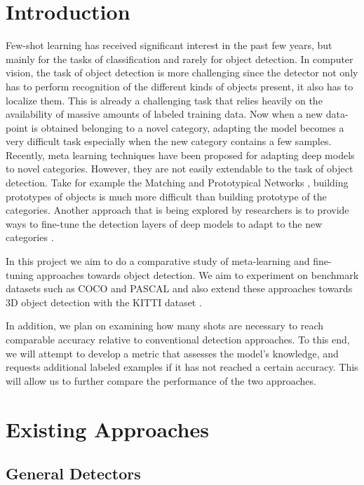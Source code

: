 \documentclass{article}
\begin{document}
\section{Introduction}
{\color{magenta}
Few-shot learning has received significant interest in the past few years, 
but mainly for the tasks of classification and rarely for object detection. 
In computer vision, the task of object detection is more challenging since the detector 
not only has to perform recognition of the different kinds of objects present,
it also has to localize them. This is already a challenging task that relies heavily 
on the availability of massive amounts of labeled training data. Now when a new data-point 
is obtained belonging to a novel category, adapting the model becomes a very difficult 
task especially when the new category contains a few samples. Recently, meta learning techniques 
have been proposed for adapting deep models to novel categories. However, they are not easily 
extendable to the task of object detection. Take for example the Matching \cite{VinyalsBLKW16} 
and Prototypical Networks \cite{snell2017prototypical}, building prototypes of objects is 
much more difficult than building prototype of the categories. Another approach that is being 
explored by researchers is to provide ways to fine-tune the detection layers of 
deep models to adapt to the new categories \cite{wang2020frustratingly}.


In this project we aim to do a comparative study of meta-learning and fine-tuning approaches 
towards object detection. We aim to experiment on benchmark datasets such as 
COCO \cite{LinMBHPRDZ14} and PASCAL \cite{Everingham10} and also extend these approaches 
towards 3D object detection with the KITTI dataset \cite{Geiger2013IJRR}.

In addition, we plan on examining how many shots are necessary to reach comparable accuracy relative to 
conventional detection approaches. To this end, we will attempt to develop a metric that assesses
the model's knowledge, and requests additional labeled examples if it has not reached a certain accuracy. 
This will allow us to further compare the performance of the two approaches. 
} 

\section{Existing Approaches}
\subsection{General Detectors}
\end{document}
